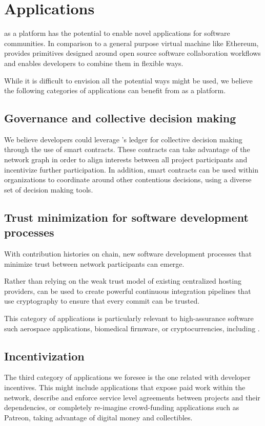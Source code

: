 \section{Applications}

\Oscoin{} as a platform has the potential to enable novel applications for
software communities. In comparison to a general purpose virtual machine like
Ethereum, \oscoin{} provides primitives designed around open source software collaboration
workflows and enables developers to combine them in flexible ways.

While it is difficult to envision all the potential ways \oscoin{} might be used, we
believe the following categories of applications can benefit from \oscoin{}
as a platform.

\subsection{Governance and collective decision making}

We believe developers could leverage \oscoin{}’s ledger for collective decision
making through the use of smart contracts. These contracts can take advantage of the
network graph in order to align interests between all project participants and
incentivize further participation. In addition, smart contracts can be used
within organizations to coordinate around other contentious decisions, using a
diverse set of decision making tools.

\subsection{Trust minimization for software development processes}
With contribution histories on chain, new software development processes that
minimize trust between network participants can emerge.

Rather than relying on the weak trust model of existing centralized hosting
providers, \oscoin{} can be used to create powerful continuous integration
pipelines that use cryptography to ensure that every commit can be trusted.

This category of applications is particularly relevant to high-assurance
software such aerospace applications, biomedical firmware, or cryptocurrencies,
including \oscoin{}.

\subsection{Incentivization}
The third category of applications we foresee is the one related with
developer incentives. This might include applications that expose paid work
within the \oscoin{} network, describe and enforce service level agreements
between projects and their dependencies, or completely re-imagine crowd-funding
applications such as Patreon, taking advantage of digital money and collectibles.

